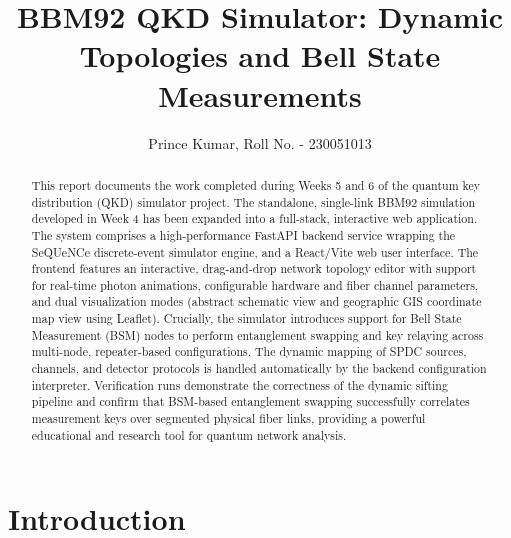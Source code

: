 \documentclass[12pt,oneside,letterpaper,english]{article}
\title{BBM92 QKD Simulator: Dynamic Topologies and Bell State Measurements}
\author{Prince Kumar, Roll No. - 230051013}
\begin{document}



\begin{abstract}
    \noindent
    This report documents the work completed during Weeks 5 and 6 of the quantum key distribution (QKD) simulator project. The standalone, single-link BBM92 simulation developed in Week 4 has been expanded into a full-stack, interactive web application. The system comprises a high-performance FastAPI backend service wrapping the SeQUeNCe discrete-event simulator engine, and a React/Vite web user interface. The frontend features an interactive, drag-and-drop network topology editor with support for real-time photon animations, configurable hardware and fiber channel parameters, and dual visualization modes (abstract schematic view and geographic GIS coordinate map view using Leaflet). Crucially, the simulator introduces support for Bell State Measurement (BSM) nodes to perform entanglement swapping and key relaying across multi-node, repeater-based configurations. The dynamic mapping of SPDC sources, channels, and detector protocols is handled automatically by the backend configuration interpreter. Verification runs demonstrate the correctness of the dynamic sifting pipeline and confirm that BSM-based entanglement swapping successfully correlates measurement keys over segmented physical fiber links, providing a powerful educational and research tool for quantum network analysis.
\end{abstract}
\newpage

\renewcommand{\baselinestretch}{1}\normalsize
\tableofcontents
\renewcommand{\baselinestretch}{1}\normalsize
\thispagestyle{fancy}
\newpage

\doublespacing
\thispagestyle{fancy}


\section{Introduction}
\end{document}
